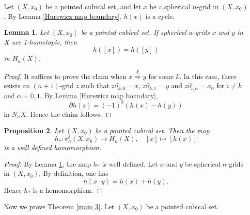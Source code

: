 \documentclass[oneside, 12pt]{amsart}
\numberwithin{equation}{section}
\theoremstyle{plain}
\newtheorem{theorem}{Theorem}[section]
\newtheorem{proposition}[theorem]{Proposition}
\newtheorem{lemma}[theorem]{Lemma}
\theoremstyle{definition}
\theoremstyle{remark}
\begin{document}
	
	
	Let $(X,x_0)$ be a pointed cubical set, and let $x$ be a spherical $n$-grid in $(X,x_0)$. By Lemma \ref{Hurewicz map boundary}, $h(x)$ is a cycle.
	
	
	
	\begin{lemma}
		\label{Hurewicz map homotopy}
		Let $(X,x_0)$ be a pointed cubical set. If spherical $n$-grids $x$ and $y$ in $X$ are 1-homotopic, then
		\[
		h([x])=h([y])
		\]
		in $H_n(X)$.
	\end{lemma}
	
	\begin{proof}
		It suffices to prove the claim when $x\overset{k}{\Rightarrow}y$ for some $k$. In this case, there exists an $(n+1)$-grid $z$ such that $z\partial_{k,0}=x$, $z\partial_{k,1}=y$ and $z\partial_{i,\alpha}=x_0$ for $i\ne k$ and $\alpha=0,1$. By Lemma \ref{Hurewicz map boundary},
		\[
		\partial h(z)=(-1)^k(h(x)-h(y))
		\]
		in $N_nX$. Hence the claim follows.
	\end{proof}
	
	
	
	\begin{proposition}
		Let $(X,x_0)$ be a pointed cubical set. Then the map
		\begin{equation}
			\label{Hurewicz map}
			h_*\colon\pi_n^\delta(X,x_0)\to H_n(X),\quad[x]\mapsto[h(x)]
		\end{equation}
		is a well defined homomorphism.
	\end{proposition}
	
	\begin{proof}
		By Lemma \ref{Hurewicz map homotopy}, the map $h_*$ is well defined. Let $x$ and $y$ be spherical $n$-grids in $(X,x_0)$. By definition, one has
		\[
		h(x\cdot y)=h(x)+h(y).
		\]
		Hence $h_*$ is a homomorphism.
	\end{proof}
	
	
	
	Now we prove Theorem \ref{main 3}. Let $(X,x_0)$ be a pointed cubical set. %
	
	
	
	
\end{document}
